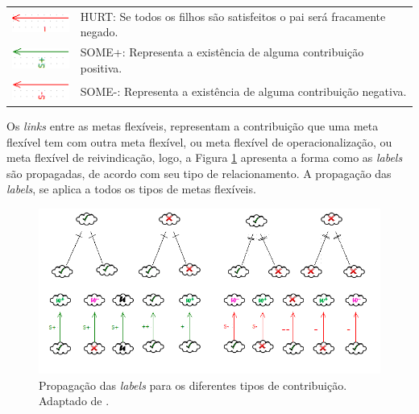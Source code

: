 \begin{table}[h!]
\begin{tabular}{|l|l|}
		\multirow{2}{*}{\includegraphics[scale=0.9]{figuras/Hurt.png}} & \multirow{2}{*}{HURT: Se todos os filhos são satisfeitos o pai será fracamente negado.} \\
		&  \\ \hline
		\multirow{2}{*}{\includegraphics[scale=0.9]{figuras/SomeMais.png}} & \multirow{2}{*}{SOME+: Representa a existência de alguma contribuição positiva.} \\
		&  \\ \hline
		\multirow{2}{*}{\includegraphics[scale=0.9]{figuras/SomeMenos.png}} & \multirow{2}{*}{SOME-: Representa a existência de alguma contribuição negativa.} \\
		&  \\ \hline
	\end{tabular}
\end{table}

\pagebreak

Os \textit{links} entre as metas flexíveis, representam a contribuição que uma meta flexível tem com outra meta flexível, ou meta flexível de operacionalização, ou meta flexível de reivindicação, logo, a Figura \ref{catalogoDeAvaliação} apresenta a forma como as \textit{labels} são propagadas, de acordo com seu tipo de relacionamento. A propagação das \textit{labels}, se aplica a todos os tipos de metas flexíveis. 

\begin{figure}[h!]
	\centering
	\includegraphics[keepaspectratio=true,scale=0.8]{figuras/catalogoDeAvaliacao.png}
	\caption{Propagação das \textit{labels} para os diferentes tipos de contribuição. Adaptado de \cite{chung2012non}.}
	\label{catalogoDeAvaliação}
\end{figure} 

